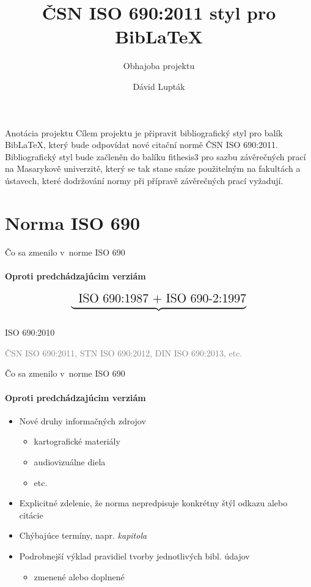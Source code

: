\documentclass{beamer}
\author{Dávid Lupták}
\title{ČSN ISO 690:2011 styl pro BibLaTeX}
\subtitle{Obhajoba projektu}
\begin{document}
\frame{\titlepage}

\begin{frame}{Anotácia projektu}
Cílem projektu je připravit bibliografický styl pro balík BibLaTeX, který bude odpovídat nové citační normě ČSN ISO 690:2011. Bibliografický styl bude začleněn do balíku fithesis3 pro sazbu závěrečných prací na Masarykově univerzitě, který se tak stane snáze použitelným na fakultách a ústavech, které dodržování normy při přípravě závěrečných prací vyžadují.
\end{frame}

\frame{\tableofcontents}

\section{Norma ISO 690}

\begin{frame}{Čo sa zmenilo v~norme ISO 690}
\framesubtitle{Oproti predchádzajúcim verziám}
\[
\underbrace{\phantom{\text{-2}}\strut\text{\Large{ISO 690:1987 + ISO 690-2:1997}}}_\text{}
\]
\begin{center}
\LARGE{ISO 690:2010}
\end{center}
\begin{center}
\textcolor{Gray}{ČSN ISO 690:2011, STN ISO 690:2012, DIN ISO 690:2013, etc.}
\end{center}
\end{frame}

\begin{frame}{Čo sa zmenilo v~norme ISO 690}
\framesubtitle{Oproti predchádzajúcim verziám}
\begin{itemize}
  \item Nové druhy informačných zdrojov
    \begin{itemize}
    \item kartografické materiály
    \item audiovizuálne diela
    \item etc.
    \end{itemize}
  \item Explicitné zdelenie, že norma nepredpisuje konkrétny štýl odkazu alebo citácie
  \item Chýbajúce termíny, napr. \emph{kapitola}
  \item Podrobnejší výklad pravidiel tvorby jednotlivých bibl. údajov
    \begin{itemize}
      \item zmenené alebo doplnené
    \end{itemize}
\end{itemize}
\end{frame}
\end{document}
